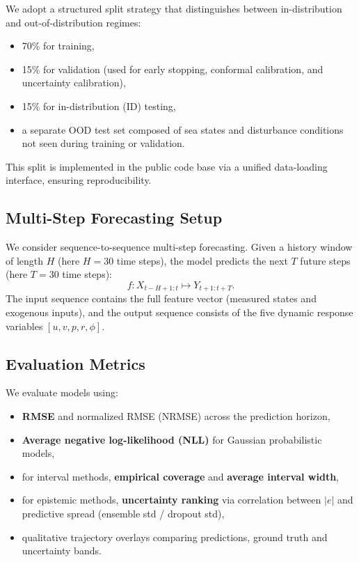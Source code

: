 \documentclass[a4paper,fleqn]{cas-sc}
\begin{document}
We adopt a structured split strategy that distinguishes between in-distribution and out-of-distribution regimes:
\begin{itemize}
    \item 70\% for training,
    \item 15\% for validation (used for early stopping, conformal calibration, and uncertainty calibration),
    \item 15\% for in-distribution (ID) testing,
    \item a separate OOD test set composed of sea states and disturbance conditions not seen during training or validation.
\end{itemize}

This split is implemented in the public code base via a unified data-loading interface, ensuring reproducibility.

\subsection{Multi-Step Forecasting Setup}

We consider sequence-to-sequence multi-step forecasting. Given a history window of length \(H\) (here \(H=30\) time steps), the model predicts the next \(T\) future steps (here \(T=30\) time steps):
\[
f: X_{t-H+1:t} \mapsto Y_{t+1:t+T}.
\]
The input sequence contains the full feature vector (measured states and exogenous inputs), and the output sequence consists of the five dynamic response variables \([u, v, p, r, \phi]\).

\subsection{Evaluation Metrics}

We evaluate models using:
\begin{itemize}
    \item \textbf{RMSE} and normalized RMSE (NRMSE) across the prediction horizon,
    \item \textbf{Average negative log-likelihood (NLL)} for Gaussian probabilistic models,
    \item for interval methods, \textbf{empirical coverage} and \textbf{average interval width},
    \item for epistemic methods, \textbf{uncertainty ranking} via correlation between \(|e|\) and predictive spread (ensemble std / dropout std),
    \item qualitative trajectory overlays comparing predictions, ground truth and uncertainty bands.
\end{itemize}
\end{document}
